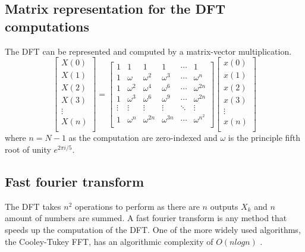 \subsection{Matrix representation for the DFT computations} 
The DFT can be represented and computed by a matrix-vector multiplication. 
$$
\begin{bmatrix}
    X(0) \\
    X(1) \\
    X(2) \\
    X(3) \\
    \vdots\\
    X(n) \\
\end{bmatrix}
=
\begin{bmatrix}
    1 & 1 & 1 & 1 & \cdots & 1\\
    1 & \omega & \omega ^2 & \omega ^3 & \cdots & \omega ^n\\
    1 & \omega ^2 & \omega ^4 & \omega ^6 & \cdots & \omega ^{2n}\\
    1 & \omega ^3 & \omega ^6 & \omega ^9 & \cdots & \omega ^{2n}\\
    \vdots & \vdots & \vdots & \vdots & \ddots & \vdots \\
    1 & \omega ^{n} & \omega ^{2n} & \omega ^{3n} & \cdots & \omega ^{{n^2}}\\
\end{bmatrix}
\begin{bmatrix}
    x(0) \\
    x(1) \\
    x(2) \\
    x(3) \\
    \vdots\\
    x(n) \\
\end{bmatrix}
$$
where $n = N-1$ as the computation are zero-indexed and $\omega$ is the principle fifth root of unity $e^{2\pi i/5} $. 

\subsection{Fast fourier transform}
The DFT takes $n^2$ operations to perform as there are $n$ outputs $X_k$ and $n$ amount of numbers are summed. A fast fourier transform is any method that speeds up the computation of the DFT. One of the more widely used algorithms, the Cooley-Tukey FFT, has an algorithmic complexity of $O(n log n)$ \cite{Randhawa2018} \cite{HeidemanEtAl1984}.

